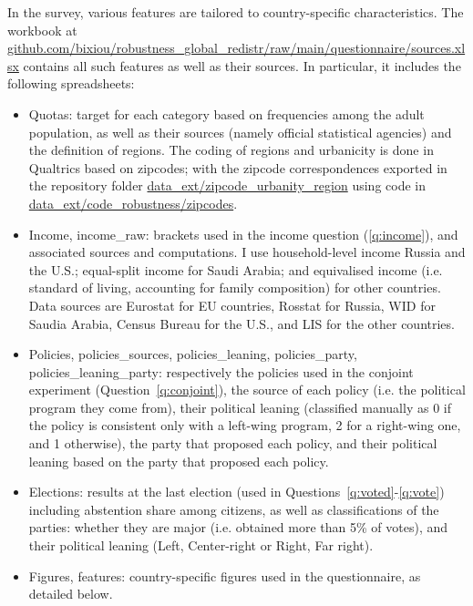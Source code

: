 In the survey, various features are tailored to country-specific characteristics. 
The workbook at \href{https://github.com/bixiou/robustness_global_redistr/raw/main/questionnaire/sources.xlsx}{github.com/bixiou/robustness\_global\_redistr/raw/main/questionnaire/sources.xlsx} contains all such features as well as their sources. 
In particular, it includes the following spreadsheets:
\begin{itemize}
    \item Quotas: target for each category based on frequencies among the adult population, as well as their sources (namely official statistical agencies) and the definition of regions. The coding of regions and urbanicity is done in Qualtrics based on zipcodes; with the zipcode correspondences exported in the repository folder \href{https://github.com/bixiou/robustness_global_redistr/raw/main/data_ext/zipcode_urbanity_region}{data\_ext/zipcode\_urbanity\_region} using code in \href{https://github.com/bixiou/robustness_global_redistr/raw/main/code_robustness/zipcodes}{data\_ext/code\_robustness/zipcodes}.
    \item Income, income\_raw: brackets used in the income question (\ref{q:income}), and associated sources and computations. I use household-level income Russia and the U.S.; equal-split income for Saudi Arabia; and equivalised income (i.e. standard of living, accounting for family composition) for other countries. Data sources are Eurostat for EU countries, Rosstat for Russia, WID for Saudia Arabia, Census Bureau for the U.S., and LIS for the other countries. 
    \item Policies, policies\_sources, policies\_leaning, policies\_party, policies\_leaning\_party: respectively the policies used in the conjoint experiment (Question~\ref{q:conjoint}), the source of each policy (i.e. the political program they come from), their political leaning (classified manually as 0 if the policy is consistent only with a left-wing program, 2 for a right-wing one, and 1 otherwise), the party that proposed each policy, and their political leaning based on the party that proposed each policy.
    \item Elections: results at the last election (used in Questions~\ref{q:voted}-\ref{q:vote}) including abstention share among citizens, as well as classifications of the parties: whether they are major (i.e. obtained more than 5\% of votes), and their political leaning (Left, Center-right or Right, Far right). 
    \item Figures, features: country-specific figures used in the questionnaire, as detailed below.
\end{itemize}

